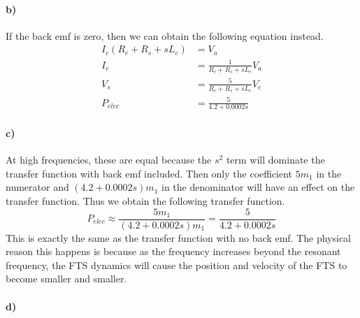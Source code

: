\documentclass[12pt]{article}
\begin{document}
\paragraph{b)}

If the back emf is zero, then we can obtain the following equation instead.
\begin{align*}
    I_c (R_c + R_s + sL_c) &= V_a\\
    I_c &=\frac{1}{R_c + R_s + sL_c}V_a\\
    V_s &= \frac{5}{R_c + R_s + sL_c}V_c\\
    P_{elec} &= \frac{5}{4.2 + 0.0002s}
\end{align*}

\paragraph{c)}

At high frequencies, these are equal because the \(s^2\) term will dominate the transfer
function with back emf included. Then only the coefficient \(5m_1\) in the numerator and
\((4.2 + 0.0002s)m_1\) in the denominator will have an effect on the transfer function.
Thus we obtain the following transfer function.
\[P_{elec} \approx \frac{5m_1}{(4.2 + 0.0002s)m_1} = \frac{5}{4.2 + 0.0002s}\]
This is exactly the same as the transfer function with no back emf. The physical reason
this happens is because as the frequency increases beyond the resonant frequency, the FTS
dynamics will cause the position and velocity of the FTS to become smaller and smaller.

\paragraph{d)}
\end{document}
